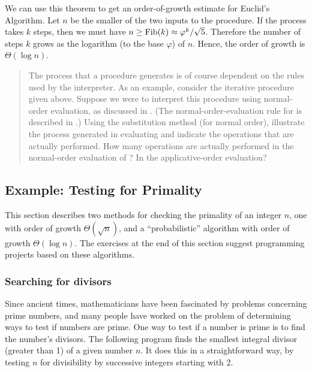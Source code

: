 \noindent
We can use this theorem to get an order-of-growth estimate for Euclid's
Algorithm.  Let \( n \) be the smaller of the two inputs to the procedure.  If
the process takes \( k \) steps, then we must have \( n \ge {\rm Fib}(k)
\approx \varphi^k / \sqrt{5} \).  Therefore the number of steps \( k \)
grows as the logarithm (to the base \( \varphi \)) of \( n \).  Hence, the order of
growth is \( \Theta(\log n) \).

\begin{quote}
 The process that a procedure
generates is of course dependent on the rules used by the interpreter.  As an
example, consider the iterative  procedure given above.  Suppose we
were to interpret this procedure using normal-order evaluation, as discussed in
.  (The normal-order-evaluation rule for  is
described in .)  Using the substitution method (for normal
order), illustrate the process generated in evaluating  and
indicate the  operations that are actually performed.  How many
 operations are actually performed in the normal-order
evaluation of ?  In the applicative-order evaluation?
\end{quote}

\subsection{Example: Testing for Primality}
\label{Section 1.2.6}

This section describes two methods for checking the primality of an integer
\( n \), one with order of growth \( \Theta(\sqrt{n}) \), and a
``probabilistic'' algorithm with order of growth \( \Theta(\log n) \).
The exercises at the end of this section suggest programming projects based on
these algorithms.

\subsubsection*{Searching for divisors}

Since ancient times, mathematicians have been fascinated by problems concerning
prime numbers, and many people have worked on the problem of determining ways
to test if numbers are prime.  One way to test if a number is prime is to find
the number's divisors.  The following program finds the smallest integral
divisor (greater than 1) of a given number \( n \).  It does this in a
straightforward way, by testing \( n \) for divisibility by successive integers
starting with 2.

